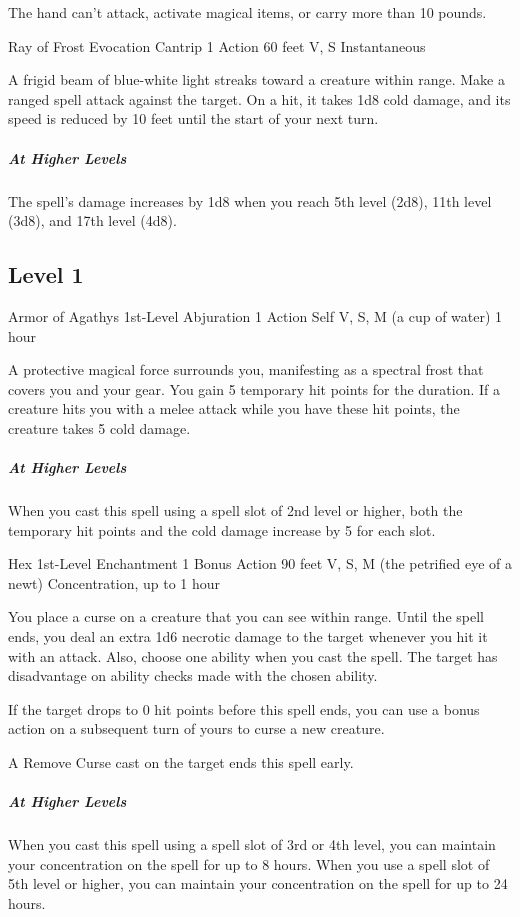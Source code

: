 {The hand can't attack, activate magical items, or carry more than 10 pounds.

\DndSpellHeader
	{Ray of Frost}
	{Evocation Cantrip}
	{1 Action}
	{60 feet}
	{V, S}
	{Instantaneous}

A frigid beam of blue-white light streaks toward a creature within range. Make a ranged spell attack against the target. On a hit, it takes 1d8 cold damage, and its speed is reduced by 10 feet until the start of your next turn.

\subparagraph*{At Higher Levels} The spell's damage increases by 1d8 when you reach 5th level (2d8), 11th level (3d8), and 17th level (4d8).

\subsection*{Level 1}

\DndSpellHeader
	{Armor of Agathys}
	{1st-Level Abjuration}
	{1 Action}
	{Self}
	{V, S, M (a cup of water)}
	{1 hour}

A protective magical force surrounds you, manifesting as a spectral frost that covers you and your gear. You gain 5 temporary hit points for the duration. If a creature hits you with a melee attack while you have these hit points, the creature takes 5 cold damage.

\subparagraph*{At Higher Levels} When you cast this spell using a spell slot of 2nd level or higher, both the temporary hit points and the cold damage increase by 5 for each slot.

\DndSpellHeader
	{Hex}
	{1st-Level Enchantment}
	{1 Bonus Action}
	{90 feet}
	{V, S, M (the petrified eye of a newt)}
	{Concentration, up to 1 hour}

You place a curse on a creature that you can see within range. Until the spell ends, you deal an extra 1d6 necrotic damage to the target whenever you hit it with an attack. Also, choose one ability when you cast the spell. The target has disadvantage on ability checks made with the chosen ability.

If the target drops to 0 hit points before this spell ends, you can use a bonus action on a subsequent turn of yours to curse a new creature.

A Remove Curse cast on the target ends this spell early.

\subparagraph*{At Higher Levels} When you cast this spell using a spell slot of 3rd or 4th level, you can maintain your concentration on the spell for up to 8 hours. When you use a spell slot of 5th level or higher, you can maintain your concentration on the spell for up to 24 hours.

}
